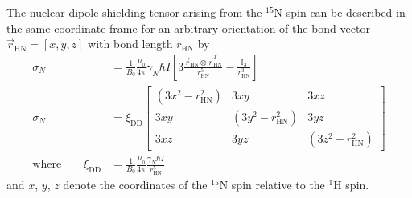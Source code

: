 \documentclass[a4paper,10pt,english,openany,oneside]{sphinxmanual}
\begin{document}
\sphinxAtStartPar
The nuclear dipole shielding tensor arising from the $^{\text{15}}$N spin can be described in the same coordinate frame for an arbitrary orientation of the bond vector \(\vec r_\text{HN}=[x,y,z]\) with bond length \(r_\text{HN}\) by
\begin{equation*}
\begin{split}\sigma_N &= \frac{1}{B_0}\frac{\mu_0}{4\pi}\gamma_N\hbar I \left[ 3\frac{\vec r_\text{HN}\otimes \vec r_\text{HN}^T}{r_\text{HN}^5} - \frac{\mathbb{I}_3}{r_\text{HN}^3} \right]\\
\sigma_N &= \xi_\text{DD}
\begin{bmatrix}
(3x^2-r_\text{HN}^2) & 3xy & 3xz\\
3xy & (3y^2-r_\text{HN}^2) & 3yz\\
3xz & 3yz & (3z^2 - r_\text{HN}^2)
\end{bmatrix}\\
\text{where} \qquad \xi_\text{DD} &= \frac{1}{B_0} \frac{\mu_0}{4\pi} \frac{\gamma_N\hbar I}{r_\text{HN}^5}\end{split}
\end{equation*}
\sphinxAtStartPar
and \(x\), \(y\), \(z\) denote the coordinates of the $^{\text{15}}$N spin relative to the $^{\text{1}}$H spin.
\end{document}
